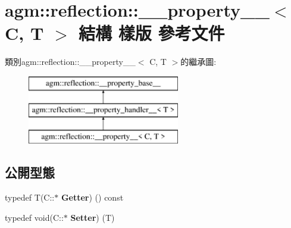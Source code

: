 \hypertarget{structagm_1_1reflection_1_1____property____}{}\section{agm\+:\+:reflection\+:\+:\+\_\+\+\_\+property\+\_\+\+\_\+$<$ C, T $>$ 結構 樣版 參考文件}
\label{structagm_1_1reflection_1_1____property____}
類別agm\+:\+:reflection\+:\+:\+\_\+\+\_\+property\+\_\+\+\_\+$<$ C, T $>$的繼承圖\+:\begin{figure}[H]
\begin{center}
\leavevmode
\includegraphics[height=3.000000cm]{structagm_1_1reflection_1_1____property____}
\end{center}
\end{figure}
\subsection*{公開型態}
\begin{DoxyCompactItemize}
\item 
typedef T(C\+::$\ast$ {\bfseries Getter}) () const \hypertarget{structagm_1_1reflection_1_1____property_____a0b38542cf6d2ad2d8b8bc7397b929202}{}\label{structagm_1_1reflection_1_1____property_____a0b38542cf6d2ad2d8b8bc7397b929202}

\item 
typedef void(C\+::$\ast$ {\bfseries Setter}) (T)\hypertarget{structagm_1_1reflection_1_1____property_____a611439cff6366d5ad0aff8200fb8928d}{}\label{structagm_1_1reflection_1_1____property_____a611439cff6366d5ad0aff8200fb8928d}

\end{DoxyCompactItemize}
